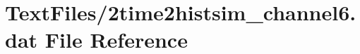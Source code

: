 \hypertarget{2time2histsim__channel6_8dat}{}\section{Text\+Files/2time2histsim\+\_\+channel6.dat File Reference}
\label{2time2histsim__channel6_8dat}

